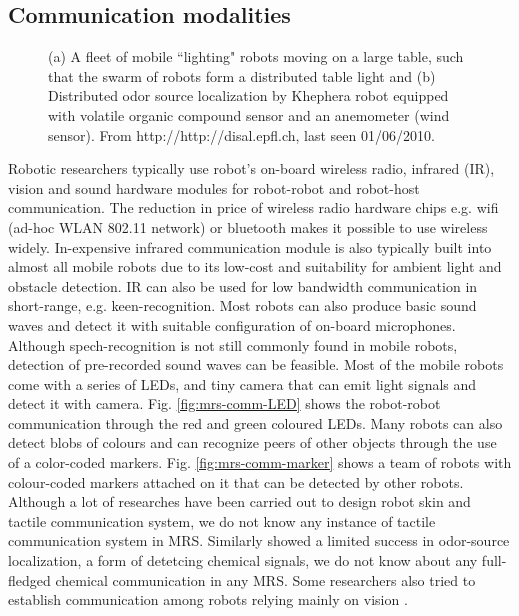 \subsection{Communication modalities}
\begin{figure}
\centering
{} 
\hspace{0.25cm}
\caption{ (a) A fleet of mobile ``lighting" robots moving on a large table, such that the swarm of robots form a distributed table light and (b) Distributed odor source localization by Khephera robot equipped with volatile organic compound sensor and an anemometer (wind sensor). From http://http://disal.epfl.ch, last seen 01/06/2010.}
\label{fig:epfl-disal}
\end{figure}
Robotic researchers typically use robot's on-board wireless radio, infrared (IR), vision and sound hardware modules for robot-robot  and robot-host communication.  The reduction in price of wireless radio hardware chips e.g. wifi (ad-hoc WLAN 802.11 network) or bluetooth makes it possible to use wireless widely. In-expensive infrared communication module is also typically built into almost all mobile robots due to its low-cost and suitability for ambient light and obstacle detection.  IR can also be used for  low bandwidth communication in short-range, e.g. keen-recognition. Most robots can also produce basic sound waves and detect it with suitable configuration of on-board microphones. Although spech-recognition is not still commonly found in mobile robots,  detection of pre-recorded sound waves can be feasible.  Most of the mobile robots come with a series of LEDs, and tiny camera that can emit light signals and detect it with camera. Fig. \ref{fig:mrs-comm-LED} shows the robot-robot communication  through the red and green coloured LEDs. Many robots can also detect blobs of colours and can recognize peers of other objects through the use of a color-coded markers.  Fig. \ref{fig:mrs-comm-marker} shows a team of robots with colour-coded markers attached on it that can be detected by other robots. Although a lot of researches have been carried out to design robot skin and tactile communication system, we do not know any instance of tactile communication system in MRS. Similarly  showed a limited success in odor-source localization, a form of detetcing chemical signals, we do not know about any full-fledged chemical communication in any MRS. Some researchers also tried to establish communication among robots relying mainly on vision \cite{Kuniyoshi1994}.
